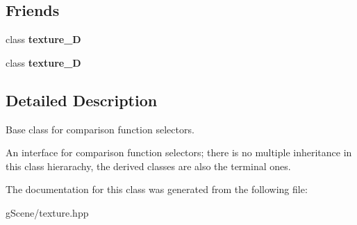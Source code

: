 \subsection*{Friends}
\begin{DoxyCompactItemize}
\item 
\hypertarget{classgfx_1_1comparison__function__t_a2039d67f6166ccf823c78e3476aad9aa}{class {\bfseries texture\-\_\-D}}\label{classgfx_1_1comparison__function__t_a2039d67f6166ccf823c78e3476aad9aa}

\item 
\hypertarget{classgfx_1_1comparison__function__t_a22ad86ef46c3b17357a0cd59e50bc7dd}{class {\bfseries texture\-\_\-D}}\label{classgfx_1_1comparison__function__t_a22ad86ef46c3b17357a0cd59e50bc7dd}

\end{DoxyCompactItemize}


\subsection{Detailed Description}
Base class for comparison function selectors. 

An interface for comparison function selectors; there is no multiple inheritance in this class hierarachy, the derived classes are also the terminal ones. 

The documentation for this class was generated from the following file\-:\begin{DoxyCompactItemize}
\item 
g\-Scene/texture.\-hpp\end{DoxyCompactItemize}

